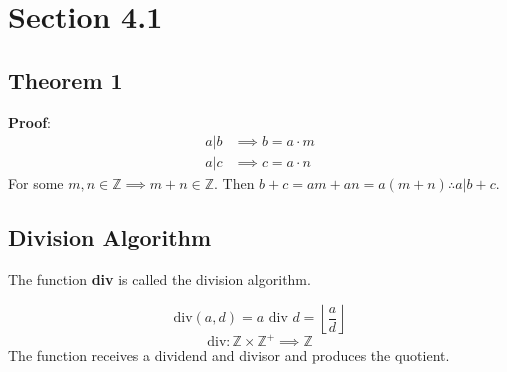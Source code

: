 \documentclass{article}
\begin{document}
\newcommand{\hr}{\par\noindent\rule{\textwidth}{0.4pt}}

\newcommand{\bc}[1]{
	\begin{equation*}
		\begin{boxed}
			{#1}
		\end{boxed}
	\end{equation*}
}

\newcommand{\cond}[2]{
	\ifmmode
	{#1} \quad {#2}
	\else
	$$ {#1} \quad {#2} $$
	\fi
}

\newcommand{\matr}[1]{
	\ifmmode \bm{#1}
	\else \textit{\textbf{#1}}
	\fi
}
\newcommand{\vect}[1]{
	\ifmmode \mathbf{#1}
	\else \textbf{#1}
	\fi
}


\newcommand{\lcm}{\text{lcm}}

\tableofcontents

\section{Section 4.1}

\subsection{Theorem 1}

\textbf{Proof}:
\begin{align*}
	a \vert b & \implies b = a \cdot m \\
	a \vert c & \implies c = a \cdot n
\end{align*}
For some $ m, n \in \mathbb{Z} \implies m + n \in \mathbb{Z} $. Then $ b + c = am + an = a(m + n) \therefore a \vert b + c $.

\subsection{Division Algorithm}

The function \textbf{div} is called the division algorithm.

\begin{equation}
	\text{div}(a, d) = a \text{ div } d = \left\lfloor \frac{ a }{ d } \right\rfloor
\end{equation}
\begin{equation}
	\text{div}: \mathbb{Z} \times \mathbb{Z}^{+} \implies \mathbb{Z}
\end{equation}
The function receives a dividend and divisor and produces the quotient.
\end{document}
